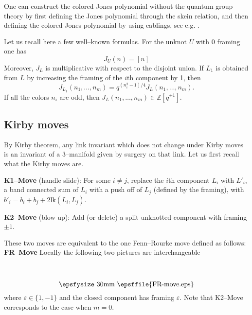 \documentclass[12pt]{amsart}
\theoremstyle{plain}
\theoremstyle{definition}
\def\BZ{\mathbb Z}
\def\lk{\operatorname{lk}}
\def\lk{{\text{lk}}}
\def\Z{\BZ}
\newcommand{\psdiag}[3]{\hspace{1mm}\raisebox{-#1mm}{\epsfysize#2mm
\epsffile{#3.eps}}\hspace{1mm}}
\begin{document}
One can construct the colored Jones polynomial without the quantum group theory  by first defining the Jones polynomial through the skein relation, and then
defining the colored Jones polynomial by using cablings, see e.g. \cite{KM, Lic}.



Let us recall here a few well--known formulas.
For the unknot $U$ with 0 framing one has
\begin{equation} J_U(n) = [n] \label{unknot}
\end{equation}
Moreover, $J_L$ is multiplicative with respect to the disjoint union.
 If $L_1$ is obtained from $L$
by increasing the framing of the $i$th component by 1, then
\begin{equation}\label{framing}
J_{L_1}(n_1,\dots,n_m) = q^{(n_i^2-1)/4} J_{L}(n_1,\dots,n_m).
\end{equation}
If all the colors $n_i$ are odd, then $J_{L}(n_1,\dots,n_m) \in \Z[q^{\pm 1}]$.








\subsection{Kirby moves}
By Kirby theorem, any link invariant which does not change
under Kirby moves is an invariant of a 3--manifold given
by surgery on that link.
Let us first recall what the Kirby moves are.
\newcommand{\tL}{\tilde L}



\vskip2mm
{\noindent \bf K1--Move} (handle slide):
For some $i\neq j$, replace the $i$th component $L_i$
with  $L'_i$, a band connected sum of $L_i$ with a push
off of $L_j$ (defined by the framing), with
$b'_i=b_i+b_j+2\lk(L_i,L_j)$.

\vskip2mm
{\noindent \bf K2--Move} (blow up): Add (or delete) a split unknotted component with framing
$\pm 1$.
\vskip2mm

These two moves are equivalent to the one Fenn--Rourke move
defined as follows:
\vskip2mm
{\noindent \bf FR--Move} Locally the following two pictures are
interchangeable
$$\psdiag{10}{30}{FR-move}$$
where $\varepsilon \in \{1,-1\}$ and
the closed component has framing $\varepsilon$.
Note that K2--Move corresponds to the case when $m=0$.
\vskip2mm
\end{document}
